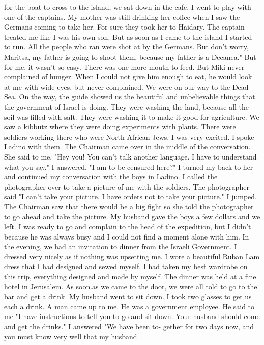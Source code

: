 for the boat to cross to the island, we sat down in the cafe. I went 
to play with one of the captains. My mother was still drinking her 
coffee when I saw the Germans coming to take her. For sure they took 
her to Haidary. The captain treated me like I was his own son. But as 
soon as I came to the island I started to run. All the people who 
ran were shot at by the Germans. But don’t worry, Maritsa, my father 
is going to shoot them, because my father is a Decanea." But for me, 
it wasn't so easy. There was one more mouth to feed. But Miki never 
complained of hunger. When I could not give him enough to eat, he 
would look at me with wide eyes, but never complained. 
We were on our way to the Dead Sea. On the way, the guide showed 
us the beautiful and unbelievable things that the government of Israel is doing. They were washing the land, because all the soil was filled 
with salt. They were washing it to make it good for agriculture. We 
saw a kibbutz where they were doing experiments with plants. There 
were soldiers working there who were North African Jews. I was very 
excited. I spoke Ladino with them. The Chairman came over in the middle 
of the conversation. She said to me, "Hey you! You can't talk another 
language. I have to understand what you say." I answered, "I am to 
be censured here?" I turned my back to her and continued my conversation 
with the boys in Ladino. I called the photographer over to take a 
picture of me with the soldiers. The photographer said "I 
can't take your picture. I have orders not to take your picture." 
I jumped. The Chairman saw that there would be a big fight so she told 
the photographer to go ahead and take the picture. My husband gave the 
boys a few dollars and we left. I was ready to go and complain to the 
head of the expedition, but I didn't because he was always busy and 
I could not find a moment alone with him. 
In the evening, we had an invitation to dinner from the Israeli 
Government. I dressed very nicely as if nothing was upsetting me. I 
wore a beautiful Ruban Lam dress that I had designed and sewed myself. 
I had taken my best wardrobe on this trip, everything designed 
and made by myself. The dinner was held at a fine hotel in Jerusalem. 
As soon.as we came to the door, we were all told to go to the bar and 
get a drink. My husband went to sit down. I took two glasses to get 
us each a drink. A man came up to me. He was a government employee. 
He said to me "I have instructions to tell you to go and sit down. Your 
husband should come and get the drinks." I answered "We have been to-
gether for two days now, and you must know very well that my husband 
